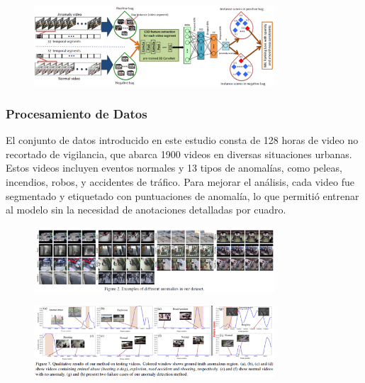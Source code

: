 \documentclass[listof=nochaptergap,12pt,times,authoryear]{report}
\begin{document}
\begin{figure}[h] %
    \centering
    \includegraphics[width=0.8\textwidth]{met5.png} %
    \label{fig:ejemplo} %
\end{figure}


\subsubsection{Procesamiento de Datos}
El conjunto de datos introducido en este estudio consta de 128 horas de video no recortado de vigilancia, que abarca 1900 videos en diversas situaciones urbanas. Estos videos incluyen eventos normales y 13 tipos de anomalías, como peleas, incendios, robos, y accidentes de tráfico. Para mejorar el análisis, cada video fue segmentado y etiquetado con puntuaciones de anomalía, lo que permitió entrenar al modelo sin la necesidad de anotaciones detalladas por cuadro.

\begin{figure}[h] %
    \centering
    \includegraphics[width=0.8\textwidth]{pro5.png} %
    \label{fig:ejemplo} %
\end{figure}

\begin{figure}[h] %
    \centering
    \includegraphics[width=0.8\textwidth]{pro5.1.png} %
    \label{fig:ejemplo} %
\end{figure}
\end{document}
